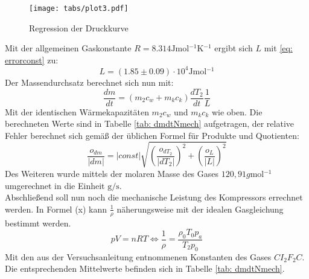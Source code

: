\begin{figure}
  \centering
  \texttt{[image: tabs/plot3.pdf]}
  \caption{Regression der Druckkurve}
  \label{fig: plot3}
\end{figure}

Mit der allgemeinen Gaskonstante $R = 8.314\si{\joule \mol^{-1} \kelvin^{-1}}$ ergibt sich $L$  mit \eqref{eq: errorconst} zu: %
\begin{equation}
  L = (1.85 \pm 0.09)\cdot 10^{4} \si{\joule \mol^{-1}} %
\end{equation}
Der Massendurchsatz berechnet sich nun mit:
\begin{equation}
  \frac{dm}{dt} = (m_2 c_w + m_k c_k)\frac{dT_2}{dt} \frac{1}{L}
\end{equation}
Mit der identischen Wärmekapazitäten $m_2 c_w$ und $m_k c_k$ wie oben. Die berechneten Werte sind in Tabelle \ref{tab: dmdtNmech} aufgetragen, der relative Fehler berechnet sich gemäß der üblichen Formel
für Produkte und Quotienten:
\begin{equation}
  \frac{o_{dm}}{\left| dm \right|} = \left| const \right| \sqrt{\left(\frac{o_{dT_2}}{\left| dT_2 \right|}\right)^2 + \left(\frac{o_{L}}{\left| L \right|}\right)^2} %
\end{equation}
Des Weiteren wurde mittels der molaren Masse des Gases $120,91 \si{g \mol ^{-1}}$ \cite{demtröder} umgerechnet in die Einheit $\si{\gram \per \second}$. \\%
Abschließend soll nun noch die mechanische Leistung des Kompressors errechnet werden. In Formel (x) kann $\frac{1}{\rho}$
näherungsweise mit der idealen Gasgleichung bestimmt werden.
\begin{equation}
  pV = nRT \Leftrightarrow  \frac{1}{\rho} = \frac{\rho_0 T_0 p_a}{T_2 p_0}
\end{equation}
Mit den aus der Versuchsanleitung \cite{anleitung206} entnommenen Konstanten des Gases $CI_2F_2C$. Die entsprechenden Mittelwerte befinden sich in Tabelle \ref{tab: dmdtNmech}.







